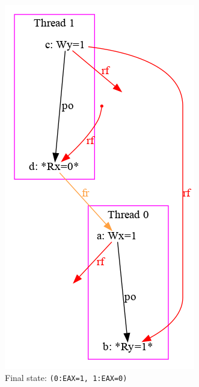 \begin{figure}[!htb]
\begin{subfigure}[t]{.23\textwidth}
  \includegraphics[width=.9\linewidth]{img/my/sb-example/SB-dot-2.png}
  \caption{Final state: \texttt{(0:EAX=1,~1:EAX=0)}}
  \label{simple_wmm_x86_pic:sub2}
\end{subfigure}
\hfill
\begin{subfigure}[t]{.23\textwidth}
  \centering

\end{subfigure}
\end{figure}
